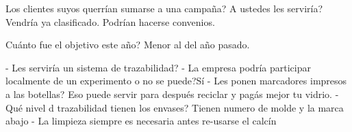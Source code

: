 Los clientes suyos querrían sumarse a una campaña? A ustedes les serviría? Vendría ya clasificado. Podrían hacerse convenios.

Cuánto fue el objetivo este año? Menor al del año pasado.


- Les serviría un sistema de trazabilidad?
- La empresa podría participar localmente de un experimento o no se puede?Sí
- Les ponen marcadores impresos a las botellas? Eso puede servir para después reciclar y pagás mejor tu vidrio.
- Qué nivel d trazabilidad tienen los envases? Tienen numero de molde y la marca abajo
- La limpieza siempre es necesaria antes re-usarse el calcín

